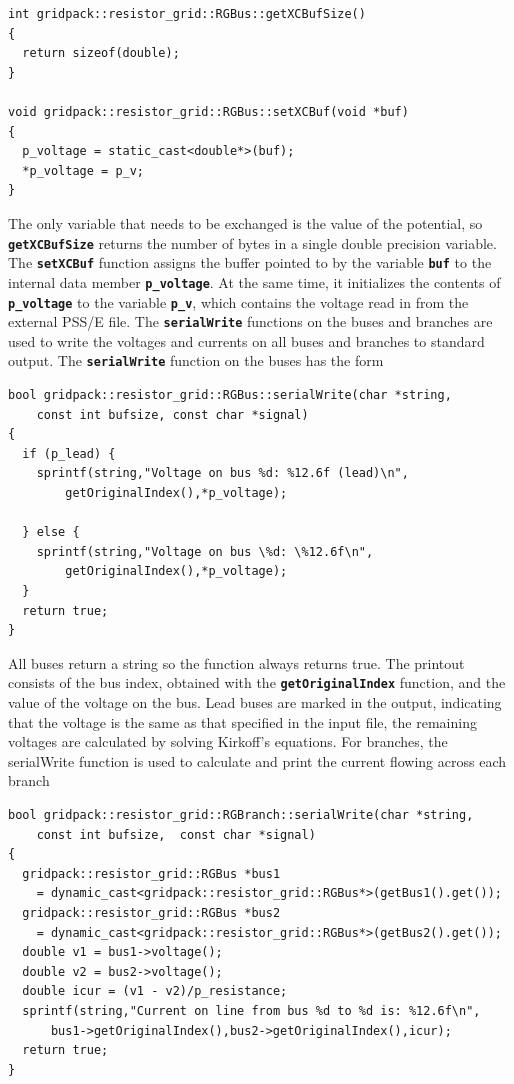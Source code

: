 {
\color{red}
\begin{Verbatim}[fontseries=b]
int gridpack::resistor_grid::RGBus::getXCBufSize()
{
  return sizeof(double);
}

void gridpack::resistor_grid::RGBus::setXCBuf(void *buf)
{
  p_voltage = static_cast<double*>(buf);
  *p_voltage = p_v;
}
\end{Verbatim}
}

The only variable that needs to be exchanged is the value of the potential, so \texttt{\textbf{getXCBufSize}} returns the number of bytes in a single double precision variable. The \texttt{\textbf{setXCBuf}} function assigns the buffer pointed to by the variable \texttt{\textbf{buf}} to the internal data member \texttt{\textbf{p\_voltage}}. At the same time, it initializes the contents of \texttt{\textbf{p\_voltage}} to the variable \texttt{\textbf{p\_v}}, which contains the voltage read in from the external PSS/E file.
The \texttt{\textbf{serialWrite}} functions on the buses and branches are used to write the voltages and currents on all buses and branches to standard output. The \texttt{\textbf{serialWrite}} function on the buses has the form

{
\color{red}
\begin{Verbatim}[fontseries=b]
bool gridpack::resistor_grid::RGBus::serialWrite(char *string,
    const int bufsize, const char *signal)
{
  if (p_lead) {
    sprintf(string,"Voltage on bus %d: %12.6f (lead)\n",
        getOriginalIndex(),*p_voltage);

  } else {
    sprintf(string,"Voltage on bus \%d: \%12.6f\n",
        getOriginalIndex(),*p_voltage);
  }
  return true;
}
\end{Verbatim}
}

All buses return a string so the function always returns true. The printout consists of the bus index, obtained with the \texttt{\textbf{getOriginalIndex}} function, and the value of the voltage on the bus. Lead buses are marked in the output, indicating that the voltage is the same as that specified in the input file, the remaining voltages are calculated by solving Kirkoff's equations. For branches, the serialWrite function is used to calculate and print the current flowing across each branch

{
\color{red}
\begin{Verbatim}[fontseries=b]
bool gridpack::resistor_grid::RGBranch::serialWrite(char *string,
    const int bufsize,  const char *signal)
{
  gridpack::resistor_grid::RGBus *bus1
    = dynamic_cast<gridpack::resistor_grid::RGBus*>(getBus1().get());
  gridpack::resistor_grid::RGBus *bus2
    = dynamic_cast<gridpack::resistor_grid::RGBus*>(getBus2().get());
  double v1 = bus1->voltage();
  double v2 = bus2->voltage();
  double icur = (v1 - v2)/p_resistance;
  sprintf(string,"Current on line from bus %d to %d is: %12.6f\n",
      bus1->getOriginalIndex(),bus2->getOriginalIndex(),icur);
  return true;
}
\end{Verbatim}
}

